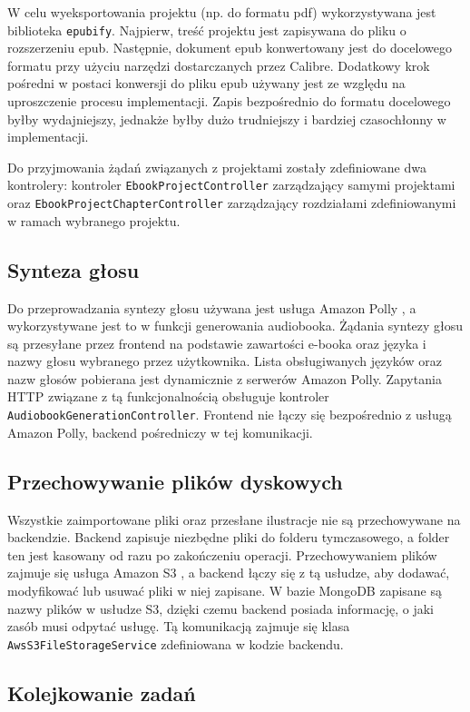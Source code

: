 W celu wyeksportowania projektu (np. do formatu pdf) wykorzystywana jest biblioteka \verb|epubify|. Najpierw, treść projektu jest zapisywana do pliku o rozszerzeniu epub. Następnie, dokument epub konwertowany jest do docelowego formatu przy użyciu narzędzi dostarczanych przez Calibre. Dodatkowy krok pośredni w postaci konwersji do pliku epub używany jest ze względu na uproszczenie procesu implementacji. Zapis bezpośrednio do formatu docelowego byłby wydajniejszy, jednakże byłby dużo trudniejszy i bardziej czasochłonny w implementacji.

Do przyjmowania żądań związanych z projektami zostały zdefiniowane dwa kontrolery: kontroler \verb|EbookProjectController| zarządzający samymi projektami oraz \verb|EbookProjectChapterController| zarządzający rozdziałami zdefiniowanymi w ramach wybranego projektu.

\subsection{Synteza głosu}

Do przeprowadzania syntezy głosu używana jest usługa Amazon Polly \cite{amazon_polly_docs}, a wykorzystywane jest to w funkcji generowania audiobooka. Żądania syntezy głosu są przesyłane przez frontend na podstawie zawartości e-booka oraz języka i nazwy głosu wybranego przez użytkownika. Lista obsługiwanych języków oraz nazw głosów pobierana jest dynamicznie z serwerów Amazon Polly. Zapytania HTTP związane z tą funkcjonalnością obsługuje kontroler \verb|AudiobookGenerationController|. Frontend nie łączy się bezpośrednio z usługą Amazon Polly, backend pośredniczy w tej komunikacji.

\subsection{Przechowywanie plików dyskowych}
Wszystkie zaimportowane pliki oraz przesłane ilustracje nie są przechowywane na backendzie. Backend zapisuje niezbędne pliki do folderu tymczasowego, a folder ten jest kasowany od razu po zakończeniu operacji. Przechowywaniem plików zajmuje się usługa Amazon S3 \cite{amazon_s3_docs}, a backend łączy się z tą usłudze, aby dodawać, modyfikować lub usuwać pliki w niej zapisane. W bazie MongoDB zapisane są nazwy plików w usłudze S3, dzięki czemu backend posiada informację, o jaki zasób musi odpytać usługę. Tą komunikacją zajmuje się klasa \verb|AwsS3FileStorageService| zdefiniowana w kodzie backendu.

\subsection{Kolejkowanie zadań}
\label{subsection:queue_backend}

